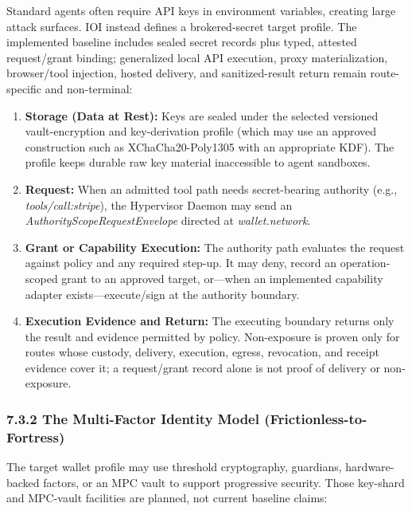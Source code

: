 \documentclass[
  11pt,
]{article}
\providecommand{\tightlist}{%
  \setlength{\itemsep}{0pt}\setlength{\parskip}{0pt}}
\begin{document}
Standard agents often require API keys in environment variables, creating
large attack surfaces. IOI instead defines a brokered-secret target profile.
The implemented baseline includes sealed secret records plus typed, attested
request/grant binding; generalized local API execution, proxy materialization,
browser/tool injection, hosted delivery, and sanitized-result return remain
route-specific and non-terminal:

\begin{enumerate}
\def\labelenumi{\arabic{enumi}.}
\tightlist
\item
  \textbf{Storage (Data at Rest):} Keys are sealed under the selected
  versioned vault-encryption and key-derivation profile (which may use an
  approved construction such as XChaCha20-Poly1305 with an appropriate KDF).
  The profile keeps durable raw key material inaccessible to agent sandboxes.
\item
  \textbf{Request:} When an admitted tool path needs secret-bearing authority
  (e.g., \emph{tools/call:stripe}), the Hypervisor Daemon may send an
  \emph{AuthorityScopeRequestEnvelope} directed at
  \emph{wallet.network}.
\item
  \textbf{Grant or Capability Execution:} The authority path evaluates the
  request against policy and any required step-up. It may deny, record an
  operation-scoped grant to an approved target, or---when an implemented
  capability adapter exists---execute/sign at the authority boundary.
\item
  \textbf{Execution Evidence and Return:} The executing boundary returns only
  the result and evidence permitted by policy. Non-exposure is proven only for
  routes whose custody, delivery, execution, egress, revocation, and receipt
  evidence cover it; a request/grant record alone is not proof of delivery or
  non-exposure.
\end{enumerate}

\hypertarget{the-multi-factor-identity-model-frictionless-to-fortress}{%
\subsubsection{7.3.2 The Multi-Factor Identity Model
(Frictionless-to-Fortress)}\label{the-multi-factor-identity-model-frictionless-to-fortress}}

The target wallet profile may use threshold cryptography, guardians,
hardware-backed factors, or an MPC vault to support progressive security.
Those key-shard and MPC-vault facilities are planned, not current baseline
claims:
\end{document}
